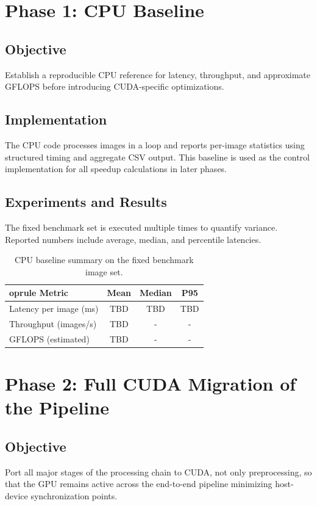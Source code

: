 \section{Phase 1: CPU Baseline}

\subsection{Objective}
Establish a reproducible CPU reference for latency, throughput, and approximate GFLOPS before introducing CUDA-specific optimizations.

\subsection{Implementation}
The CPU code processes images in a loop and reports per-image statistics using structured timing and aggregate CSV output. This baseline is used as the control implementation for all speedup calculations in later phases.

\subsection{Experiments and Results}
The fixed benchmark set is executed multiple times to quantify variance. Reported numbers include average, median, and percentile latencies.

\begin{table}[H]
\centering
\begin{tabular}{lccc}
	oprule
Metric & Mean & Median & P95 \\
\midrule
Latency per image (ms) & TBD & TBD & TBD \\
Throughput (images/s) & TBD & - & - \\
GFLOPS (estimated) & TBD & - & - \\
\bottomrule
\end{tabular}
\caption{CPU baseline summary on the fixed benchmark image set.}
\end{table}

\section{Phase 2: Full CUDA Migration of the Pipeline}

\subsection{Objective}
Port all major stages of the processing chain to CUDA, not only preprocessing, so that the GPU remains active across the end-to-end pipeline minimizing host-device synchronization points.

